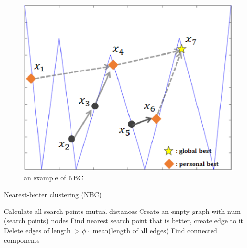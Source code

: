 \documentclass[a4j,11pt]{jarticle}
\begin{document}
\begin{figure}[t]
\centering
\includegraphics[width=0.8\linewidth]{eps/nbc.eps}
\caption{an example of NBC}
\label{fig:nbc}
\end{figure}

\begin{algorithm}[H]
\caption{Nearest-better clustering (NBC)}
\label{code:nbc}
\begin{algorithmic}[3]
\STATE Calculate all search points mutual distances
\STATE Create an empty graph with num (search points) nodes
\STATE Find nearest search point that is better, create edge to it
\ENDFOR
\STATE Delete edges of length $> \phi \cdot$ mean(length of all edges)
\STATE Find connected components 
\end{algorithmic}
\end{algorithm}



\end{document}
